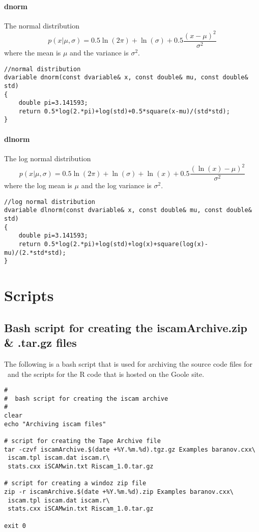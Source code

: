\paragraph{dnorm} The normal distribution
\[
	p(x|\mu,\sigma) = 0.5\ln(2\pi)+\ln(\sigma)+0.5\frac{(x-\mu)^2}{\sigma^2}
\]
where the mean is $\mu$ and the variance is $\sigma^2$.
\begin{verbatim}
//normal distribution
dvariable dnorm(const dvariable& x, const double& mu, const double& std)
{
	double pi=3.141593;
	return 0.5*log(2.*pi)+log(std)+0.5*square(x-mu)/(std*std);
}
\end{verbatim}

\paragraph{dlnorm} The log normal distribution
\[
	p(x|\mu,\sigma) = 0.5\ln(2\pi)+\ln(\sigma)+\ln(x)+0.5\frac{(\ln(x)-\mu)^2}{\sigma^2}
\]
where the log mean is $\mu$ and the log variance is $\sigma^2$.
\begin{verbatim}
//log normal distribution
dvariable dlnorm(const dvariable& x, const double& mu, const double& std)
{
	double pi=3.141593;
	return 0.5*log(2.*pi)+log(std)+log(x)+square(log(x)-mu)/(2.*std*std);
}
\end{verbatim}


\section{Scripts}
\subsection{Bash script for creating the iscamArchive.zip \& .tar.gz files}
The following is a bash script that is used for archiving the source code files for \iscam\ and the scripts for the R code that is hosted on the Goole site.

\begin{lstlisting}
#
#  bash script for creating the iscam archive
#
clear
echo "Archiving iscam files"

# script for creating the Tape Archive file
tar -czvf iscamArchive.$(date +%Y.%m.%d).tgz.gz Examples baranov.cxx\
 iscam.tpl iscam.dat iscam.r\
 stats.cxx iSCAMwin.txt Riscam_1.0.tar.gz

# script for creating a windoz zip file
zip -r iscamArchive.$(date +%Y.%m.%d).zip Examples baranov.cxx\
 iscam.tpl iscam.dat iscam.r\
 stats.cxx iSCAMwin.txt Riscam_1.0.tar.gz

exit 0
\end{lstlisting}

